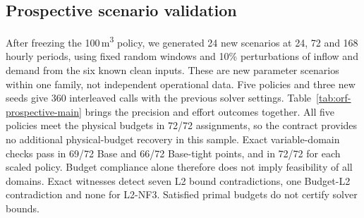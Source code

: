\subsection{Prospective scenario validation}
\label{subsec:orf-prospective}
After freezing the 100\,m\textsuperscript{3} policy, we generated 24 new scenarios
at 24, 72 and 168 hourly periods, using fixed random windows and 10\% perturbations
of inflow and demand from the six known clean inputs. These are new parameter
scenarios within one family, not independent operational data. Five policies and
three new seeds give 360 interleaved calls with the previous solver settings.
Table~\ref{tab:orf-prospective-main} brings the precision and effort outcomes
together. All five policies meet the physical budgets in 72/72 assignments, so
the contract provides no additional physical-budget recovery in this sample.
Exact variable-domain checks pass in 69/72 Base and 66/72 Base-tight points,
and in 72/72 for each scaled policy. Budget compliance alone therefore does
not imply feasibility of all domains.
Exact witnesses detect seven L2 bound contradictions, one Budget-L2 contradiction
and none for L2-NF3. Satisfied primal budgets do not certify solver bounds.

